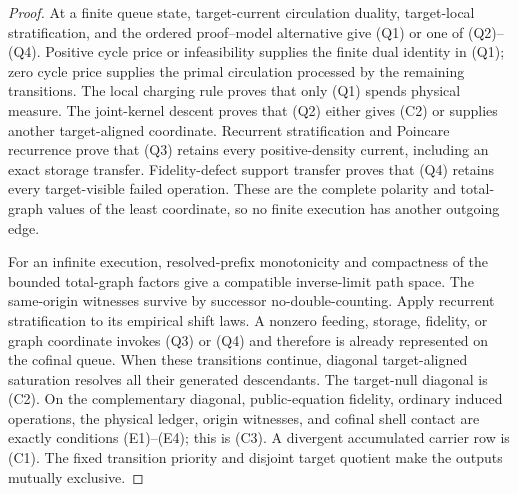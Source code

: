\documentclass[11pt]{article}
\numberwithin{section}{part}
\theoremstyle{plain}
\theoremstyle{definition}
\theoremstyle{remark}
\begin{document}
\begin{proof}
At a finite queue state, target-current circulation duality, target-local
stratification, and the ordered proof--model alternative give
\textup{(Q1)} or one of \textup{(Q2)}--\textup{(Q4)}.  Positive cycle price
or infeasibility supplies the finite dual identity in \textup{(Q1)}; zero
cycle price supplies the primal circulation processed by the remaining
transitions.  The local charging rule proves that only \textup{(Q1)} spends
physical measure.  The joint-kernel descent proves that
\textup{(Q2)} either gives \textup{(C2)} or supplies another target-aligned
coordinate.  Recurrent stratification and Poincare recurrence prove that
\textup{(Q3)} retains every positive-density current, including an exact
storage transfer.  Fidelity-defect support transfer proves that
\textup{(Q4)} retains every target-visible failed operation.  These are the
complete polarity and total-graph values of the least coordinate, so no
finite execution has another outgoing edge.

For an infinite execution, resolved-prefix monotonicity and compactness of
the bounded total-graph factors give a compatible inverse-limit path space.
The same-origin witnesses survive by successor no-double-counting.  Apply
recurrent stratification to its empirical shift laws.  A nonzero feeding,
storage, fidelity, or graph coordinate invokes \textup{(Q3)} or
\textup{(Q4)} and therefore is already represented on the cofinal queue.
When these transitions continue, diagonal target-aligned saturation resolves
all their generated descendants.  The target-null diagonal is
\textup{(C2)}.  On the complementary diagonal, public-equation fidelity,
ordinary induced operations, the physical ledger, origin witnesses, and
cofinal shell contact are exactly conditions \textup{(E1)}--\textup{(E4)};
this is \textup{(C3)}.  A divergent accumulated carrier row is
\textup{(C1)}.  The fixed transition priority and disjoint target quotient
make the outputs mutually exclusive.
\end{proof}
\end{document}
